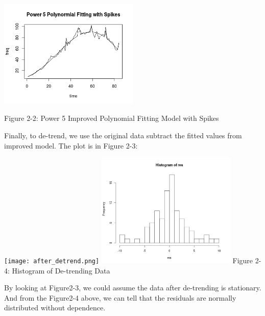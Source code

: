 \documentclass[11pt,a4paper]{article}
\begin{document}
\begin{itemize}
\begin{center}
\includegraphics[width=0.5\textwidth]{WithSpikes.png}

{Figure 2-2: Power 5 Improved Polynomial Fitting Model with Spikes}
\end{center}
Finally, to de-trend, we use the original data subtract the fitted values from improved model. The plot is in Figure 2-3:


\texttt{[image: after\_detrend.png]}
\includegraphics[width=0.5\textwidth]{Hist_res.png}
\hspace{3cm}{Figure 2-3: De-trending Data Plot}\hspace{4cm} {Figure 2-4: Histogram of De-trending Data}

By looking at Figure2-3, we could assume the data after de-trending is stationary. And from the Figure2-4 above, we can tell that the residuals are normally distributed without dependence.





\end{itemize}
\end{document}
